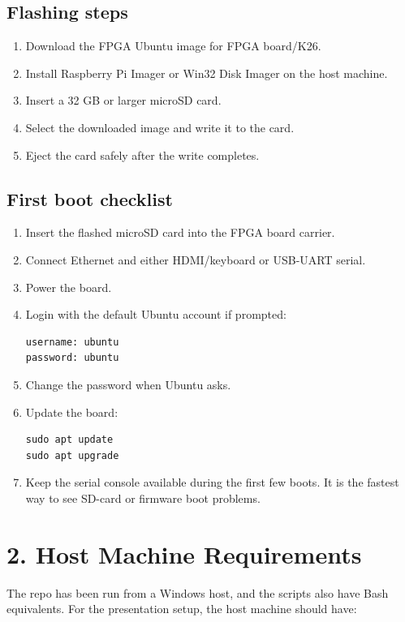 \documentclass[11pt]{article}
\begin{document}
\subsection{Flashing steps}
\begin{enumerate}[leftmargin=*]
\item Download the FPGA Ubuntu image for FPGA board/K26.
\item Install Raspberry Pi Imager or Win32 Disk Imager on the host machine.
\item Insert a 32 GB or larger microSD card.
\item Select the downloaded image and write it to the card.
\item Eject the card safely after the write completes.
\end{enumerate}

\subsection{First boot checklist}
\begin{enumerate}[leftmargin=*]
\item Insert the flashed microSD card into the FPGA board carrier.
\item Connect Ethernet and either HDMI/keyboard or USB-UART serial.
\item Power the board.
\item Login with the default Ubuntu account if prompted:
\begin{lstlisting}[style=cmd]
username: ubuntu
password: ubuntu
\end{lstlisting}
\item Change the password when Ubuntu asks.
\item Update the board:
\begin{lstlisting}[style=cmd]
sudo apt update
sudo apt upgrade
\end{lstlisting}
\item Keep the serial console available during the first few boots. It is the
fastest way to see SD-card or firmware boot problems.
\end{enumerate}

\section{2. Host Machine Requirements}
The repo has been run from a Windows host, and the scripts also have Bash
equivalents. For the presentation setup, the host machine should have:
\end{document}
